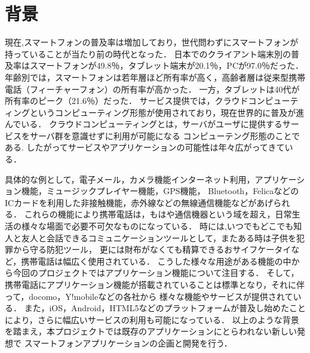 \section{背景}
\par 
現在,スマートフォンの普及率は増加しており，世代問わずにスマートフォンが持っていることが当たり前の時代となった．
日本でのクライアント端末別の普及率はスマートフォンが49.8％，タブレット端末が20.1％，PCが97.0％だった．
年齢別では，スマートフォンは若年層ほど所有率が高く，高齢者層は従来型携帯電話（フィーチャーフォン）の所有率が高かった．
一方，タブレットは40代が所有率のピーク（21.6％）だった．
サービス提供では，クラウドコンピューティングというコンピューティング形態が使用されており，現在世界的に普及が進んでいる．
クラウドコンピューティングとは，サーバがユーザに提供するサービスをサーバ群を意識せずに利用が可能になる
コンピューテング形態のことである.
したがってサービスやアプリケーションの可能性は年々広がってきている．
\par
具体的な例として，電子メール，カメラ機能インターネット利用，アプリケーション機能，ミュージックプレイヤー機能，GPS機能，
Bluetooth，FelicaなどのICカードを利用した非接触機能，赤外線などの無線通信機能などがあげられる．
これらの機能により携帯電話は，もはや通信機器という域を超え，日常生活の様々な場面で必要不可欠なものになっている．
時には,いつでもどこでも知人と友人と会話できるコミュニケーションツールとして，またある時は子供を犯罪から守る防犯ツール，
更には財布がなくても精算できるおサイフケータイなど，携帯電話は幅広く使用されている．
こうした様々な用途がある機能の中から今回のプロジェクトではアプリケーション機能について注目する．
そして，携帯電話にアプリケーション機能が搭載されていることは標準となり，それに伴って，docomo，Y!mobileなどの各社から
様々な機能やサービスが提供されている．
また，iOS，Android，HTML5などのプラットフォームが普及し始めたことにより，さらに幅広いサービスの利用も可能になっている．
以上のような背景を踏まえ，本プロジェクトでは既存のアプリケーションにとらわれない新しい発想で
スマートフォンアプリケーションの企画と開発を行う．
